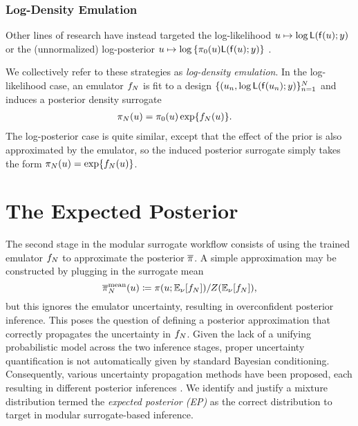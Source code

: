 \documentclass[12pt]{article}
\begin{document}
\subsubsection{Log-Density Emulation} \label{sec:ldens-em}
Other lines of research have instead targeted the log-likelihood $u \mapsto \log \mathsf{L}(\mathsf{f}(u); y)$
\citep{VehtariParallelGP,FATES_CES,trainDynamics,quantileApprox,
ActiveLearningMCMC,FerEmulation,StuartTeck1,random_fwd_models,
GP_PDE_priors,OakleyllikEm,JosephMinEnergy,AlawiehIterativeGP}
or the (unnormalized) log-posterior 
$u \mapsto \log \left\{\pi_0(u)\mathsf{L}(\mathsf{f}(u); y)\right\}$
\citep{emPostDens,Kandasamy_2017,llikRBF,gp_surrogates_random_exploration,
landslideCalibration}.

We collectively refer to these strategies as \textit{log-density emulation}. In the 
log-likelihood case, an emulator $f_{N}$ is fit to a design 
$\{(u_n, \log \mathsf{L}(\mathsf{f}(u_n); y)\}_{n=1}^{N}$
and induces a posterior density surrogate 
\begin{align}
\pi_{N}(u) &= \pi_0(u) \exp\mathopen{}\left\{f_{N}(u)\right\}\mathclose{}. \label{eq:post-em-llik}
\end{align}
The log-posterior case is quite similar, except that the effect of the prior is also 
approximated by the emulator, so the induced posterior surrogate simply takes 
the form $\pi_{N}(u) = \exp\mathopen{}\left\{f_{N}(u)\right\}\mathclose{}$.

\section{The Expected Posterior} \label{sec:EP}
The second stage in the modular surrogate workflow consists of using the 
trained emulator $f_{N}$ to approximate the posterior $\overline{\pi}$.
A simple approximation may be constructed by plugging in the surrogate mean
\begin{equation}
\overline{\pi}_{N}^{\mathrm{mean}}(u) \coloneqq \pi(u; \mathbb{E}_{\nu_{}}[f_{N}]) / Z(\mathbb{E}_{\nu_{}}[f_{N}]),
\label{eq:mean-approx}
\end{equation}
but this ignores the emulator uncertainty, resulting in overconfident 
posterior inference. This poses the question of defining a posterior approximation 
that correctly propagates the uncertainty in $f_{N}$.
Given the lack of a unifying probabilistic model across the two inference stages, 
proper uncertainty quantification is not automatically given by standard Bayesian 
conditioning. Consequently, various uncertainty propagation methods have been 
proposed, each resulting in different posterior inferences 
\citep{BilionisBayesSurrogates,StuartTeck1,VehtariParallelGP,BurknerSurrogate,
FerEmulation}.
We identify and justify a mixture distribution termed the 
\textit{expected posterior (EP)} as the correct distribution to target in 
modular surrogate-based inference. 
\end{document}

